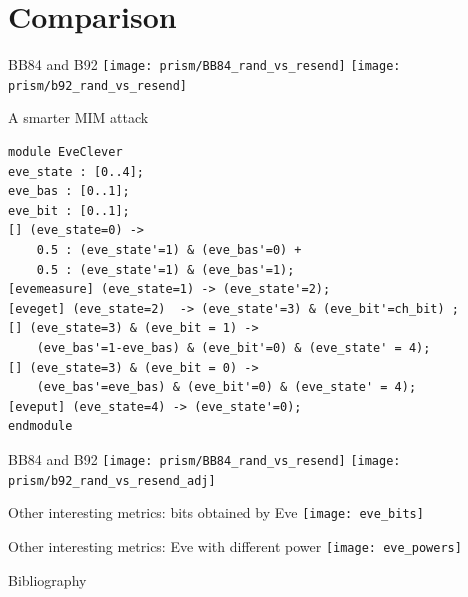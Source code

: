 \documentclass{beamer}
\begin{document}
	
\section{Comparison}
\begin{frame}{BB84 and B92}
\texttt{[image: prism/BB84\_rand\_vs\_resend]}
\texttt{[image: prism/b92\_rand\_vs\_resend]}
\end{frame}
	
\begin{frame}[fragile]{A smarter MIM attack}
\begin{footnotesize}
\begin{verbatim}
module EveClever
eve_state : [0..4];
eve_bas : [0..1];
eve_bit : [0..1];
[] (eve_state=0) -> 
    0.5 : (eve_state'=1) & (eve_bas'=0) + 
    0.5 : (eve_state'=1) & (eve_bas'=1);
[evemeasure] (eve_state=1) -> (eve_state'=2);
[eveget] (eve_state=2)  -> (eve_state'=3) & (eve_bit'=ch_bit) ;
[] (eve_state=3) & (eve_bit = 1) -> 
    (eve_bas'=1-eve_bas) & (eve_bit'=0) & (eve_state' = 4);
[] (eve_state=3) & (eve_bit = 0) -> 
    (eve_bas'=eve_bas) & (eve_bit'=0) & (eve_state' = 4);
[eveput] (eve_state=4) -> (eve_state'=0);
endmodule
\end{verbatim}
\end{footnotesize}
\end{frame}

\begin{frame}{BB84 and B92}
\texttt{[image: prism/BB84\_rand\_vs\_resend]}
\texttt{[image: prism/b92\_rand\_vs\_resend\_adj]}
\end{frame}

\begin{frame}{Other interesting metrics: bits obtained by Eve}
\texttt{[image: eve\_bits]}
\end{frame}

\begin{frame}{Other interesting metrics: Eve with different power}
\centering
\texttt{[image: eve\_powers]}
\end{frame}

\begin{frame}{Bibliography}
\nocite{*}
{\footnotesize } 
\end{frame}
\end{document}
